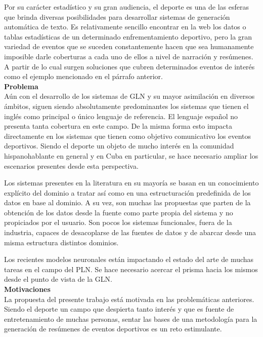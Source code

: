    Por su carácter estadístico y su gran audiencia, el deporte es una de las esferas que brinda diversas posibilidades para desarrollar sistemas 
de generación automática de texto. Es relativamente sencillo encontrar en la web los datos o tablas estadísticas de un determinado enfrementamiento deportivo, 
pero la gran variedad de eventos que se suceden constantemente hacen que sea humanamente imposible darle coberturas a cada uno de ellos a nivel de narración y 
resúmenes. A partir de lo cual surgen soluciones que cubren determinados eventos de interés como el ejemplo mencionado en el párrafo anterior.\\


   \textbf{Problema}\\

    Aún con el desarrollo de los sistemas de GLN y su mayor asimilación en diversos ámbitos, siguen siendo absolutamente predominantes los 
sistemas que tienen el inglés como principal o único lenguaje de referencia. El lenguaje español no presenta tanta cobertura en este 
campo. De la misma forma esto impacta directamente en los sistemas que tienen como objetivo comunicativo los eventos deportivos. Siendo el 
deporte un objeto de mucho interés en la comunidad hispanohablante en general y en Cuba en particular, se hace necesario ampliar los escenarios 
presentes desde esta perspectiva.

    Los sistemas presentes en la literatura en su mayoría se basan en un conocimiento explícito del dominio a tratar así como en una 
estructuración predefinida de los datos en base al dominio. A su vez, son muchas las propuestas que parten de la obtención de los datos desde 
la fuente como parte propia del sistema y no propiciados por el usuario. Son pocos los sistemas funcionales, fuera de la industria, capaces de 
desacoplarse de las fuentes de datos y de abarcar desde una misma estructura distintos dominios.

    Los recientes modelos neuronales están impactando el estado del arte de muchas tareas en el campo del PLN. Se hace necesario 
acercar el prisma hacia los mismos desde el punto de vista de la GLN.\\

    \textbf{Motivaciones}\\

    La propuesta del presente trabajo está motivada en las problemáticas anteriores. Siendo el deporte un campo que despierta tanto 
interés y que es fuente de entretenamiento de muchas personas, sentar las bases de una metodología para la generación de resúmenes de 
eventos deportivos es un reto estimulante.

